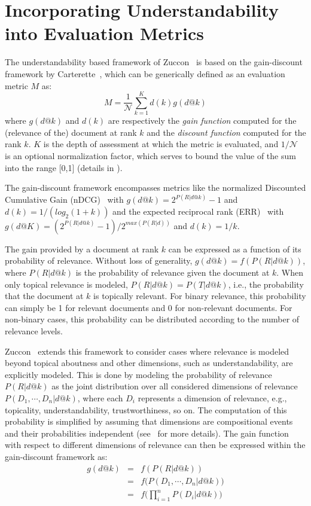 \section{Incorporating Understandability into Evaluation Metrics}
\label{sec:understandability_metrics}

The understandability based framework of Zuccon~\cite{zuccon16} is based on the gain-discount framework by Carterette~\cite{carterette11}, which can be generically defined as an evaluation metric $M$ as:
%
\begin{equation}
M=\frac{1}{\mathcal{N}} \sum_{k=1}^{K} d(k) g(d@k)
\end{equation}
%
where $g(d@k)$ and $d(k)$ are respectively the \textit{gain function} computed for the (relevance of the) document at rank $k$ and the \textit{discount function} computed for the rank $k$.
$K$ is the depth of assessment at which the metric is evaluated, and $1/\mathcal{N}$ is an optional normalization factor, which serves to bound the value of the sum into the range [0,1] (details in \cite{smucker12}).

The gain-discount framework encompasses metrics like the normalized Discounted Cumulative Gain (nDCG)~\cite{jarvelin02} with $g(d@k) = 2^{P(R|d@k)} - 1$ and $d(k) = 1/(log_2(1 + k))$ 
and the expected reciprocal rank (ERR)~\cite{chapelle09} with $g(d@K) =  (2^{P (R|d@k)} - 1)/2^{max(P (R|d))}$ and $d(k) = 1/k$.

The gain provided by a document at rank $k$ can be expressed as a function of its probability of relevance. Without loss of generality, $g(d@k) = f(P(R|d@k))$, where $P(R|d@k)$ is the probability of relevance given the document at $k$. 
When only topical relevance is modeled, $P(R|d@k) = P(T|d@k)$, i.e., the probability that the document at $k$ is topically relevant. 
For binary relevance, this probability can simply be 1 for relevant documents and 0 for non-relevant documents. For non-binary cases, this probability can be distributed according to the number of relevance levels.

Zuccon~\cite{zuccon16} extends this framework to consider cases where relevance is modeled beyond topical aboutness and other dimensions, such as understandability, are explicitly modeled.
This is done by modeling the probability of relevance $P(R|d@k)$ as the joint distribution over all considered dimensions of relevance $P(D_1, \cdots, D_n|d@k)$, where  each $D_i$ represents a dimension of relevance, e.g., topicality, understandability, trustworthiness, so on. The computation of this probability is simplified by assuming  that dimensions are compositional events and their probabilities independent (see~\cite{zuccon16} for more details). The gain function with respect to different dimensions of relevance can then be expressed within the gain-discount framework as:
%
\begin{eqnarray}
    g(d@k) &=& f(P(R|d@k)) \\
    &=& f\big(P(D_1, \cdots, D_n|d@k)\big) \\
    &=& f\Big(\prod_{i=1}^n P(D_i|d@k)\Big) 
\end{eqnarray}
%

